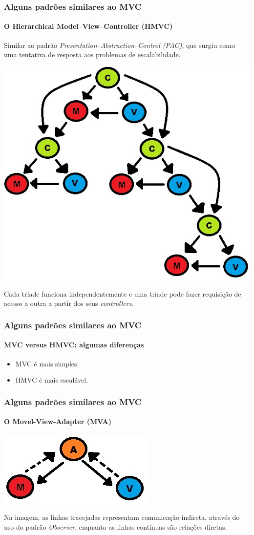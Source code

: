\documentclass{beamer}
\begin{document}
\begin{frame}
\frametitle{Alguns padrões similares ao MVC}
\framesubtitle{O Hierarchical Model–View–Controller (HMVC)}
  Similar ao padrão \textit{Presentation–Abstraction–Control (PAC)}, que surgiu como uma tentativa de resposta aos problemas de escalabilidade.
	\begin{center}
		\includegraphics[scale=0.175]{HMVC.jpg}
	\end{center}
	Cada tríade funciona independentemente e uma tríade pode fazer requisição de acesso a outra a partir dos seus \textit{controllers}.
\end{frame}

\begin{frame}
\frametitle{Alguns padrões similares ao MVC}
\framesubtitle{MVC versus HMVC: algumas diferenças}
	\begin{itemize}
	\item MVC é mais simples.
	\item HMVC é mais escalável.
\end{itemize}
\end{frame}

\begin{frame}
\frametitle{Alguns padrões similares ao MVC}
\framesubtitle{O Movel-View-Adapter (MVA)}
	\begin{center}
		\includegraphics[scale=0.4]{MVA.jpg}
	\end{center}
	Na imagem, as linhas tracejadas representam comunicação indireta, através do uso do padrão \textit{Observer}, enquanto as linhas contínuas são relações diretas.
\end{frame}
\end{document}
